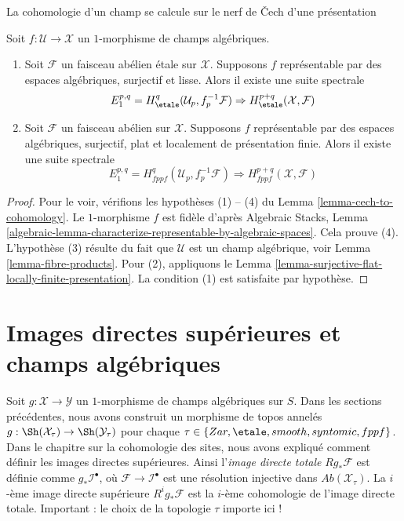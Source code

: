 \begin{proposition}
\label{proposition-smooth-covering-compute-cohomology}
\begin{slogan}
La cohomologie d'un champ se calcule sur le nerf de Čech d'une présentation
\end{slogan}
Soit $f : \mathcal{U} \to \mathcal{X}$ un $1$-morphisme de champs algébriques.
\begin{enumerate}
\item Soit $\mathcal{F}$ un faisceau abélien étale sur $\mathcal{X}$.
Supposons $f$ représentable par des espaces algébriques, surjectif et lisse.
Alors il existe une suite spectrale
$$
E_1^{p, q} = H^q_\etale(\mathcal{U}_p, f_p^{-1}\mathcal{F})
\Rightarrow
H^{p + q}_\etale(\mathcal{X}, \mathcal{F})
$$
\item Soit $\mathcal{F}$ un faisceau abélien sur $\mathcal{X}$.
Supposons $f$ représentable par des espaces algébriques, surjectif, plat
et localement de présentation finie. Alors il existe
une suite spectrale
$$
E_1^{p, q} = H^q_{fppf}(\mathcal{U}_p, f_p^{-1}\mathcal{F})
\Rightarrow
H^{p + q}_{fppf}(\mathcal{X}, \mathcal{F})
$$
\end{enumerate}
\end{proposition}

\begin{proof}
Pour le voir, vérifions les hypothèses (1) -- (4) du
Lemma \ref{lemma-cech-to-cohomology}.
Le $1$-morphisme $f$ est fidèle d'après
Algebraic Stacks, Lemma
\ref{algebraic-lemma-characterize-representable-by-algebraic-spaces}.
Cela prouve (4).
L'hypothèse (3) résulte du fait que $\mathcal{U}$ est un champ
algébrique, voir
Lemma \ref{lemma-fibre-products}.
Pour (2), appliquons le
Lemma \ref{lemma-surjective-flat-locally-finite-presentation}.
La condition (1) est satisfaite par hypothèse.
\end{proof}










\section{Images directes supérieures et champs algébriques}
\label{section-higher-direct-images}

\noindent
Soit $g : \mathcal{X} \to \mathcal{Y}$ un $1$-morphisme de champs algébriques
sur $S$. Dans les sections précédentes, nous avons construit un morphisme de topos
annelés $g : \Sh(\mathcal{X}_\tau) \to \Sh(\mathcal{Y}_\tau)$
pour chaque $\tau \in \{Zar, \etale, smooth, syntomic, fppf\}$.
Dans le chapitre sur la cohomologie des sites, nous avons expliqué comment
définir les images directes supérieures. Ainsi l'{\it image directe totale}
$Rg_*\mathcal{F}$ est définie comme $g_*\mathcal{I}^\bullet$, où
$\mathcal{F} \to \mathcal{I}^\bullet$ est une résolution injective dans
$\textit{Ab}(\mathcal{X}_\tau)$. La $i$-ème image directe supérieure
$R^ig_*\mathcal{F}$ est la $i$-ème cohomologie de l'image directe totale.
Important : le choix de la topologie $\tau$ importe ici !

